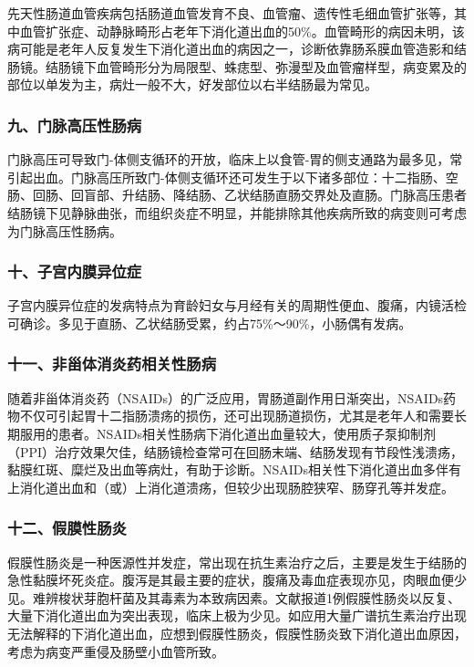 先天性肠道血管疾病包括肠道血管发育不良、血管瘤、遗传性毛细血管扩张等，其中血管扩张症、动静脉畸形占老年下消化道出血的50\%。血管畸形的病因未明，该病可能是老年人反复发生下消化道出血的病因之一，诊断依靠肠系膜血管造影和结肠镜。结肠镜下血管畸形分为局限型、蛛痣型、弥漫型及血管瘤样型，病变累及的部位以单发为主，病灶一般不大，好发部位以右半结肠最为常见。

\subsubsection{九、门脉高压性肠病}

门脉高压可导致门-体侧支循环的开放，临床上以食管-胃的侧支通路为最多见，常引起出血。门脉高压所致门-体侧支循环还可发生于以下诸多部位：十二指肠、空肠、回肠、回盲部、升结肠、降结肠、乙状结肠直肠交界处及直肠。门脉高压患者结肠镜下见静脉曲张，而组织炎症不明显，并能排除其他疾病所致的病变则可考虑为门脉高压性肠病。

\subsubsection{十、子宫内膜异位症}

子宫内膜异位症的发病特点为育龄妇女与月经有关的周期性便血、腹痛，内镜活检可确诊。多见于直肠、乙状结肠受累，约占75\%～90\%，小肠偶有发病。

\subsubsection{十一、非甾体消炎药相关性肠病}

随着非甾体消炎药（NSAIDs）的广泛应用，胃肠道副作用日渐突出，NSAIDs药物不仅可引起胃十二指肠溃疡的损伤，还可出现肠道损伤，尤其是老年人和需要长期服用的患者。NSAIDs相关性肠病下消化道出血量较大，使用质子泵抑制剂（PPI）治疗效果欠佳，结肠镜检查常可在回肠末端、结肠发现有节段性浅溃疡，黏膜红斑、糜烂及出血等病灶，有助于诊断。NSAIDs相关性下消化道出血多伴有上消化道出血和（或）上消化道溃疡，但较少出现肠腔狭窄、肠穿孔等并发症。

\subsubsection{十二、假膜性肠炎}

假膜性肠炎是一种医源性并发症，常出现在抗生素治疗之后，主要是发生于结肠的急性黏膜坏死炎症。腹泻是其最主要的症状，腹痛及毒血症表现亦见，肉眼血便少见。难辨梭状芽胞杆菌及其毒素为本致病因素。文献报道1例假膜性肠炎以反复、大量下消化道出血为突出表现，临床上极为少见。如应用大量广谱抗生素治疗出现无法解释的下消化道出血，应想到假膜性肠炎，假膜性肠炎致下消化道出血原因，考虑为病变严重侵及肠壁小血管所致。

